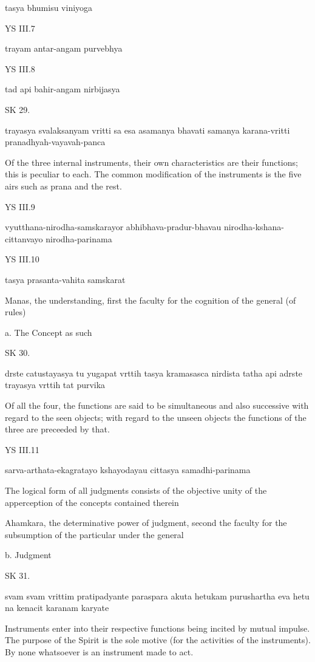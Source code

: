     tasya bhumisu viniyoga

YS III.7

    trayam antar-angam purvebhya

YS III.8

    tad api bahir-angam nirbijasya

SK 29.

trayasya svalaksanyam vritti sa esa asamanya bhavati
samanya karana-vritti pranadhyah-vayavah-panca

Of the three internal instruments, their own characteristics are their functions;
this is peculiar to each.
The common modification of the instruments is the five airs
such as prana and the rest.

YS III.9

    vyutthana-nirodha-samskarayor abhibhava-pradur-bhavau nirodha-kshana-cittanvayo nirodha-parinama

YS III.10

    tasya prasanta-vahita samskarat

    Manas, the understanding, first the faculty for the cognition of the general (of rules)

    a. The Concept as such

SK 30.

drste catustayasya tu yugapat vrttih tasya kramasasca nirdista
tatha api adrste trayasya vrttih tat purvika

Of all the four, the functions are said to be simultaneous and also successive
with regard to the seen objects;
with regard to the unseen objects
the functions of the three are preceeded by that.

YS III.11

    sarva-arthata-ekagratayo kshayodayau cittasya samadhi-parinama

    The logical form of all judgments consists of the objective unity of
    the apperception of the concepts contained therein

    Ahamkara, the determinative power of judgment,
    second the faculty for the subsumption of the particular under the general

    b. Judgment

SK 31.

svam svam vrittim pratipadyante paraspara akuta hetukam
purushartha eva hetu na kenacit karanam karyate

Instruments enter into their respective functions being incited by mutual impulse.
The purpose of the Spirit is the sole motive (for the activities of the instruments).
By none whatsoever is an instrument made to act.

